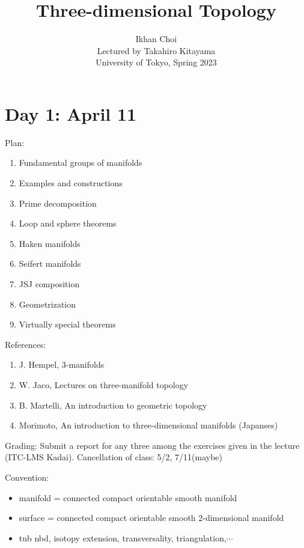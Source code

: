 \documentclass{../../small}
\begin{document}
\title{Three-dimensional Topology}
\author{Ikhan Choi\\Lectured by Takahiro Kitayama\\University of Tokyo, Spring 2023}
\maketitle
\tableofcontents

\newpage
\section{Day 1: April 11}

Plan:
\begin{enumerate}
\item Fundamental groups of manifolds
\item Examples and constructions
\item Prime decomposition
\item Loop and sphere theorems
\item Haken manifolds
\item Seifert manifolds
\item JSJ composition
\item Geometrization
\item Virtually special theorems
\end{enumerate}

\noindent References:
\begin{enumerate}
\item J. Hempel, 3-manifolds
\item W. Jaco, Lectures on three-manifold topology
\item B. Martelli, An introduction to geometric topology
\item Morimoto, An introduction to three-dimensional manifolds (Japanses)
\end{enumerate}

\noindent Grading:
Submit a report for any three among the exercises given in the lecture (ITC-LMS Kadai).
Cancellation of class: 5/2, 7/11(maybe)

\noindent Convention:
\begin{itemize}
\item manifold = connected compact orientable smooth manifold
\item surface = connected compact orientable smooth 2-dimensional manifold
\item tub nbd, isotopy extension, transversality, triangulation,$\cdots$
\end{itemize}
\end{document}
